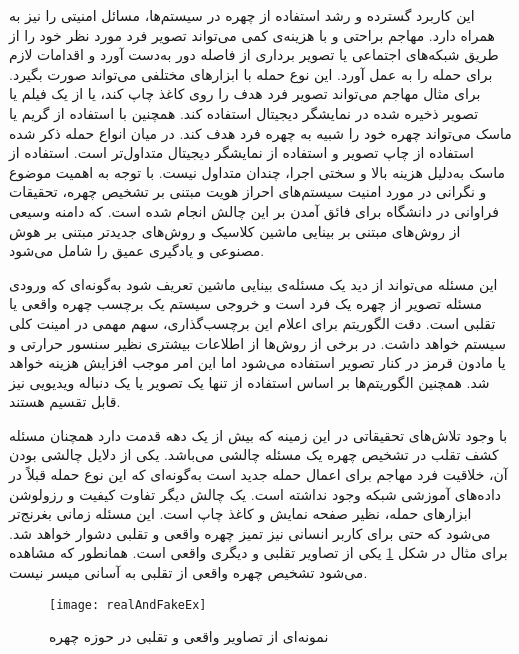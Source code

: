 این کاربرد گسترده و رشد استفاده از چهره در سیستم‌ها، مسائل امنیتی را نیز به همراه دارد. مهاجم براحتی و با هزینه‌ی کمی می‌تواند تصویر فرد مورد نظر خود را از طریق شبکه‌های اجتماعی یا تصویر برداری از فاصله دور به‌دست آورد و اقدامات لازم برای حمله را به عمل آورد.
این نوع حمله با ابزارهای مختلفی می‌تواند صورت بگیرد. برای مثال مهاجم می‌تواند تصویر فرد هدف را روی کاغذ چاپ کند، یا از یک فیلم یا تصویر ذخیره شده در نمایشگر دیجیتال استفاده کند. همچنین با استفاده از گریم یا ماسک می‌تواند چهره خود را شبیه به چهره فرد هدف کند. در میان انواع حمله ذکر شده استفاده از چاپ تصویر و استفاده از نمایشگر دیجیتال متداول‌تر است. استفاده از ماسک به‌دلیل هزینه بالا و سختی اجرا، چندان متداول نیست. با توجه به اهمیت موضوع و نگرانی در مورد امنیت سیستم‌های احراز هویت مبتنی بر تشخیص چهره، تحقیقات فراوانی در دانشگاه برای فائق آمدن بر این چالش انجام شده است. که دامنه وسیعی از روش‌های مبتنی بر بینایی ماشین کلاسیک و روش‌های جدیدتر مبتنی بر هوش مصنوعی و یادگیری عمیق را شامل می‌شود.


این مسئله می‌تواند از دید یک مسئله‌ی بینایی ماشین تعریف شود به‌گونه‌ای که ورودی مسئله تصویر از چهره یک فرد است و خروجی سیستم یک برچسب چهره واقعی یا تقلبی است. دقت الگوریتم برای اعلام این برچسب‌گذاری، سهم مهمی در امینت کلی سیستم خواهد داشت. در برخی از روش‌ها از اطلاعات بیشتری نظیر سنسور حرارتی و یا مادون قرمز در کنار تصویر استفاده می‌شود اما این امر موجب افزایش هزینه خواهد شد. همچنین الگوریتم‌ها بر اساس استفاده از تنها یک تصویر یا یک دنباله ویدیویی نیز قابل تقسیم هستند.


با وجود تلاش‌های تحقیقاتی در این زمینه که بیش از یک دهه قدمت دارد همچنان مسئله کشف تقلب در تشخیص چهره یک مسئله چالشی می‌باشد. یکی از دلایل چالشی بودن آن، خلاقیت فرد مهاجم برای اعمال حمله جدید است به‌گونه‌ای که این نوع حمله قبلاً در داده‌های آموزشی شبکه وجود نداشته است. یک چالش دیگر تفاوت کیفیت و رزولوشن ابزارهای حمله، نظیر صفحه نمایش و کاغذ چاپ است. این مسئله زمانی بغرنج‌تر می‌شود که حتی برای کاربر انسانی نیز تمیز چهره واقعی و تقلبی دشوار خواهد شد. برای مثال در شکل 
\ref{fig:realandfake}
یکی از تصاویر تقلبی و دیگری واقعی است. همانطور که مشاهده می‌شود تشخیص چهره واقعی از تقلبی به آسانی میسر نیست.


\begin{figure}[ht]
	\centerline{\texttt{[image: realAndFakeEx]}}
	\caption{نمونه‌ای از تصاویر واقعی و تقلبی در حوزه چهره \cite{boulkenafet2017oulu}}
	\label{fig:realandfake}
\end{figure}

